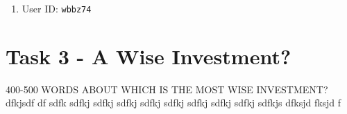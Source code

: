 \documentclass[11pt]{article}
\begin{document}
\begin{enumerate}
\item User ID: \texttt{wbbz74}
\end{enumerate}

\section*{Task 3 - A Wise Investment?}


400-500 WORDS ABOUT WHICH IS THE MOST WISE INVESTMENT? dfkjsdf df sdfk sdfkj sdfkj sdfkj sdfkj sdfkj sdfkj sdfkj sdfkj sdfkjs dfksjd fksjd f
\end{document}
